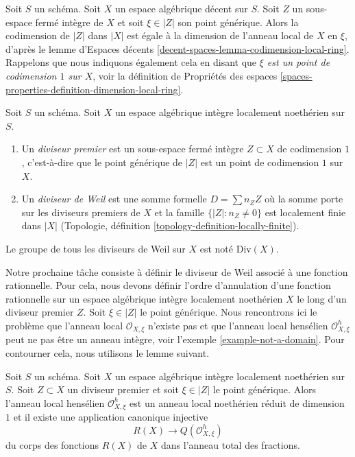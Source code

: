 \noindent
Soit $S$ un schéma. Soit $X$ un espace algébrique décent sur $S$.
Soit $Z$ un sous-espace fermé intègre de $X$ et soit
$\xi \in |Z|$ son point générique. Alors la codimension de
$|Z|$ dans $|X|$ est égale à la dimension de l'anneau local
de $X$ en $\xi$, d'après
le lemme d'Espaces décents \ref{decent-spaces-lemma-codimension-local-ring}.
Rappelons que nous indiquons également cela en disant que
{\it $\xi$ est un point de codimension $1$ sur $X$}, voir la
définition de Propriétés des espaces
\ref{spaces-properties-definition-dimension-local-ring}.

\begin{definition}
\label{definition-Weil-divisor}
Soit $S$ un schéma.
Soit $X$ un espace algébrique intègre localement noethérien sur $S$.
\begin{enumerate}
\item Un {\it diviseur premier} est un sous-espace fermé intègre $Z \subset X$
de codimension $1$, c'est-à-dire que le point générique de $|Z|$ est un point
de codimension $1$ sur $X$.
\item Un {\it diviseur de Weil} est une somme formelle $D = \sum n_Z Z$ où
la somme porte sur les diviseurs premiers de $X$ et la famille
$\{|Z| : n_Z \not = 0\}$ est localement finie dans $|X|$
(Topologie, définition \ref{topology-definition-locally-finite}).
\end{enumerate}
Le groupe de tous les diviseurs de Weil sur $X$ est noté $\text{Div}(X)$.
\end{definition}

\noindent
Notre prochaine tâche consiste à définir le diviseur de Weil associé à une fonction
rationnelle. Pour cela, nous devons définir l'ordre d'annulation d'une
fonction rationnelle sur un espace algébrique intègre localement noethérien $X$
le long d'un diviseur premier $Z$. Soit $\xi \in |Z|$ le point générique.
Nous rencontrons ici le problème que l'anneau local $\mathcal{O}_{X, \xi}$
n'existe pas et que l'anneau local hensélien $\mathcal{O}_{X, \xi}^h$
peut ne pas être un anneau intègre, voir l'exemple \ref{example-not-a-domain}.
Pour contourner cela, nous utilisons le lemme suivant.

\begin{lemma}
\label{lemma-order-vanishing}
Soit $S$ un schéma. Soit $X$ un espace algébrique intègre localement noethérien
sur $S$. Soit $Z \subset X$ un diviseur premier et soit $\xi \in |Z|$
le point générique. Alors l'anneau local hensélien $\mathcal{O}_{X, \xi}^h$
est un anneau local noethérien réduit de dimension $1$ et
il existe une application canonique injective
$$
R(X) \longrightarrow Q(\mathcal{O}_{X, \xi}^h)
$$
du corps des fonctions $R(X)$ de $X$ dans l'anneau total des fractions.
\end{lemma}

